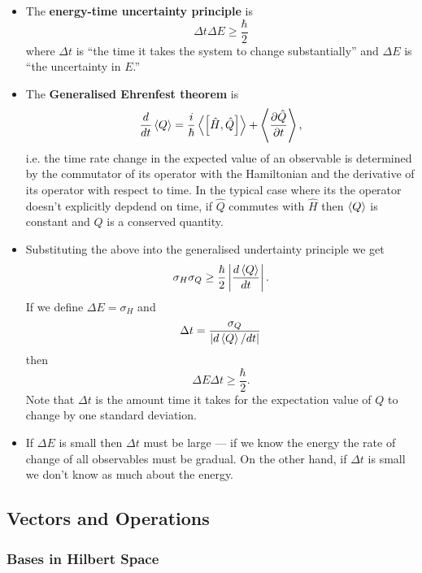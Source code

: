 \documentclass{article}
\begin{document}
\begin{itemize}
  \item The \textbf{energy-time uncertainty principle} is \[\Delta t \Delta E \ge \frac{\hbar}{2}\] where $\Delta t$ is ``the time it takes the system to change substantially'' and $\Delta E$ is ``the uncertainty in $E$.''

  \item The \textbf{Generalised Ehrenfest theorem} is \[\frac{d}{d t} \braket{Q} = \frac{i}{\hbar} \Braket{\left[ \hat{H}, \hat{Q} \right]} + \Braket{\frac{\partial \hat{Q}}{\partial t}},\] i.e. the time rate change in the expected value of an observable is determined by the commutator of its operator with the Hamiltonian and the derivative of its operator with respect to time. In the typical case where its the operator doesn't explicitly depdend on time, if $\hat{Q}$ commutes with $\hat{H}$ then $\braket{Q}$ is constant and $Q$ is a conserved quantity.

  \item Substituting the above into the generalised undertainty principle we get \[\sigma_H \sigma_Q \ge \frac{\hbar}{2} \left| \frac{d \braket{Q}}{d t} \right|.\] If we define $\Delta E = \sigma_H$ and \[\Delta t = \frac{\sigma_Q}{|d \braket{Q} / d t|}\] then \[\Delta E \Delta t \ge \frac{\hbar}{2}.\] Note that $\Delta t$ is the amount time it takes for the expectation value of $Q$ to change by one standard deviation.

  \item If $\Delta E$ is small then $\Delta t$ must be large — if we know the energy the rate of change of all observables must be gradual. On the other hand, if $\Delta t$ is small we don't know as much about the energy.
\end{itemize}

\subsection{Vectors and Operations}

\subsubsection{Bases in Hilbert Space}
\end{document}
